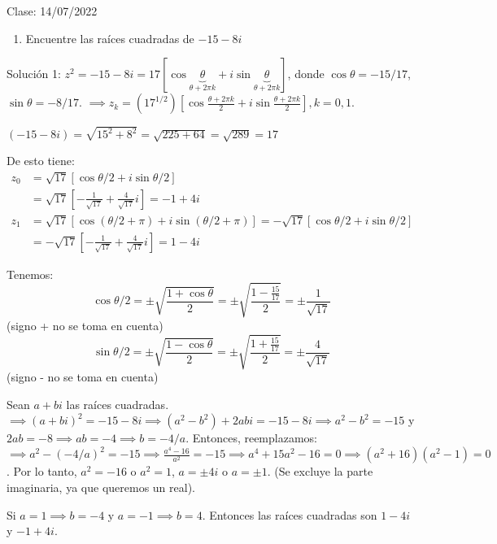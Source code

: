 Clase: 14/07/2022

\begin{ejemplo}
    \begin{enumerate}
        \item Encuentre las raíces cuadradas de $-15 -8i$
    \end{enumerate}
    \begin{sol}
        Solución 1: $z^2 = -15-8i=17[\cos \underbrace{\theta}_{\theta +2\pi k} + i\sin \underbrace{\theta}_{\theta +2\pi k}]$, donde $\cos \theta= -15/17$, $\sin\theta = -8/17$. $\implies z_k=(17^{1/2})\left[\cos \frac{\theta +2\pi k}{2}+i \sin \frac{\theta +2\pi k}{2}\right], k=0,1$. 
        \begin{cajita}
            $(-15-8i)=\sqrt{15^2+8^2}=\sqrt{225+64}=\sqrt{289}=17$ 
        \end{cajita}

        De esto tiene: 
        \begin{align*}
            z_0 &= \sqrt{17}\left[\cos \theta/2 + i\sin \theta /2\right]\\
            &= \sqrt{17}\left[-\frac{1}{\sqrt{17}}+\frac{4}{\sqrt{17}}i\right] = -1+4i\\
            z_1 &= \sqrt{17}\left[\cos (\theta/2+\pi) + i\sin (\theta /2 +\pi)\right] = -\sqrt{17}\left[\cos \theta/2 +i \sin \theta/2\right]\\
            &= -\sqrt{17}\left[-\frac{1}{\sqrt{17}}+\frac{4}{\sqrt{17}}i\right] = 1-4i
        \end{align*}
        \begin{cajita}
            Tenemos: 
            $$\cos \theta/2 = \pm \sqrt{\frac{1+\cos \theta}{2}}= \pm \sqrt{\frac{1-\frac{15}{17}}{2}}= \pm \frac{1}{\sqrt{17}}$$
            (signo + no se toma en cuenta)
            $$\sin \theta/2 = \pm \sqrt{\frac{1-\cos \theta}{2}}= \pm \sqrt{\frac{1+\frac{15}{17}}{2}}= \pm \frac{4}{\sqrt{17}}$$
            (signo - no se toma en cuenta)
        \end{cajita}
        
    \end{sol}
    \begin{sol}
        Sean $a+bi$ las raíces cuadradas. $\implies (a+bi)^2 = -15-8i\implies (a^2-b^2)+2abi = -15-8i\implies a^2-b^2 =-15$ y $2ab = -8\implies ab=-4\implies b=-4/a$. Entonces, reemplazamos: 
        $\implies a^2 - (-4/a)^2 =-15\implies \frac{a^4-16}{a^2}=-15\implies a^4+15a^2-16=0\implies (a^2+16)(a^2-1)=0$. Por lo tanto, $a^2=-16$ o $a^2=1$, $a=\pm 4i$ o $a=\pm 1$. (Se excluye la parte imaginaria, ya que queremos un real). 

        Si $a=1\implies b=-4$ y $a=-1\implies b=4$. Entonces las raíces cuadradas son $1-4i$ y $-1+4i$.
    \end{sol}
\end{ejemplo}

